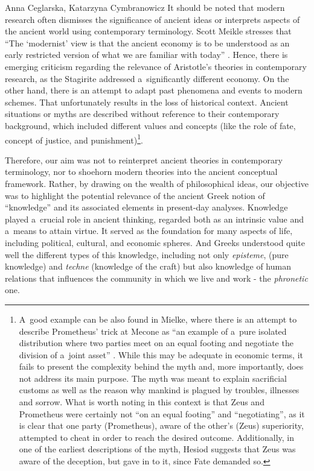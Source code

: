 \begin{artengenv2auth}{Anna Ceglarska, Katarzyna Cymbranowicz}
It should be noted that modern research often dismisses the significance of ancient ideas or interprets aspects of the ancient world using contemporary terminology. Scott Meikle stresses that ``The ‘modernist' view is that the ancient economy is to be understood as an early restricted version of what we are familiar with today'' 
\parencite[][p.2]{meikle_aristotles_1995}. %
 Hence, there is emerging criticism regarding the relevance of Aristotle's theories in contemporary research, as the Stagirite addressed a~significantly different economy. On the other hand, there is an attempt to adapt past phenomena and events to modern schemes. That unfortunately results in the loss of historical context. Ancient situations or myths are described without reference to their contemporary background, which included different values and concepts (like the role of fate, concept of justice, and punishment)\footnote{A~good example can be also found in Mielke, where there is an attempt to describe Prometheus' trick at Mecone as ``an example of a~pure isolated distribution where two parties meet on an equal footing and negotiate the division of a~joint asset'' 
\parencite[][p.178]{meikle_aristotles_1995}. %
 While this may be adequate in economic terms, it fails to present the complexity behind the myth and, more importantly, does not address its main purpose. The myth was meant to explain sacrificial customs as well as the reason why mankind is plagued by troubles, illnesses and sorrow. What is worth noting in this context is that Zeus and Prometheus were certainly not ``on an equal footing'' and ``negotiating'', as it is clear that one party (Prometheus), aware of the other's (Zeus) superiority, attempted to cheat in order to reach the desired outcome. Additionally, in one of the earliest descriptions of the myth, Hesiod suggests that Zeus was aware of the deception, but gave in to it, since Fate demanded so.}.



Therefore, our aim was not to reinterpret ancient theories in contemporary terminology, nor to shoehorn modern theories into the ancient conceptual framework. Rather, by drawing on the wealth of philosophical ideas, our objective was to highlight the potential relevance of the ancient Greek notion of ``knowledge'' and its associated elements in present-day analyses. Knowledge played a~crucial role in ancient thinking, regarded both as an intrinsic value and a~means to attain virtue. It served as the foundation for many aspects of life, including political, cultural, and economic spheres. And Greeks understood quite well the different types of this knowledge, including not only \textit{episteme}, (pure knowledge) and \textit{techne} (knowledge of the craft) but also knowledge of human relations that influences the community in which we live and work - the \textit{phronetic} one.




\end{artengenv2auth}

